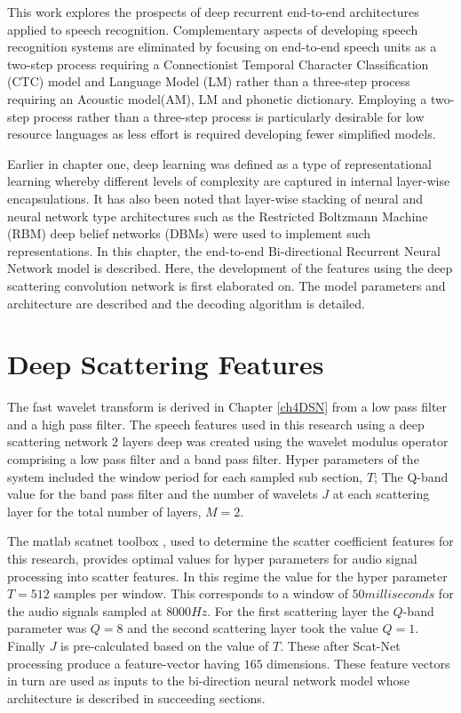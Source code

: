 This work explores the prospects of deep recurrent end-to-end architectures applied to speech recognition. Complementary aspects of developing speech recognition systems are eliminated by focusing on end-to-end speech units as a two-step process requiring a Connectionist Temporal Character Classification (CTC)\citep{graves2006connectionist} model and Language Model (LM) rather than a three-step process requiring an Acoustic model(AM), LM and phonetic dictionary. Employing a two-step process rather than a three-step process is particularly desirable for low resource languages as less effort is required developing fewer simplified models.

Earlier in chapter one, deep learning was defined as a type of representational learning whereby different levels of complexity are captured in internal layer-wise encapsulations. It has also been noted that layer-wise stacking of neural and neural network type architectures such as the Restricted Boltzmann Machine (RBM) deep belief networks (DBMs) were used to implement such representations. In this chapter, the end-to-end Bi-directional Recurrent Neural Network model is described. Here, the development of the features using the deep scattering convolution network is first elaborated on. The model parameters and architecture are described and the decoding algorithm is detailed.

\section{Deep Scattering Features}
The fast wavelet transform is derived in Chapter \ref{ch4DSN} from a low pass filter and a high pass filter.  The speech features used in this research using a deep scattering network $2$ layers deep was created using the wavelet modulus operator comprising a low pass filter and a band pass filter.  Hyper parameters of the system included the window period for each sampled sub section, $T$;  The Q-band value for the band pass filter and the number of wavelets $J$ at each scattering layer for the total number of layers, $M=2$.

The matlab scatnet toolbox \citep{anden2014scatnet}, used to determine the scatter coefficient features for this research, provides optimal values for hyper parameters for audio signal processing into scatter features.  In this regime the value for the hyper parameter $T=512$ samples per window. This corresponds to a window of $50 milliseconds$ for the audio signals sampled at $8000 Hz$.  For the first scattering layer the $Q$-band parameter was $Q=8$ and the second scattering layer took the value  $Q=1$.  Finally $J$ is pre-calculated based on the value of $T$.  These after Scat-Net processing produce a feature-vector having $165$  dimensions.  These feature vectors in turn are used as inputs to the bi-direction neural network model whose architecture is described in  succeeding sections.

